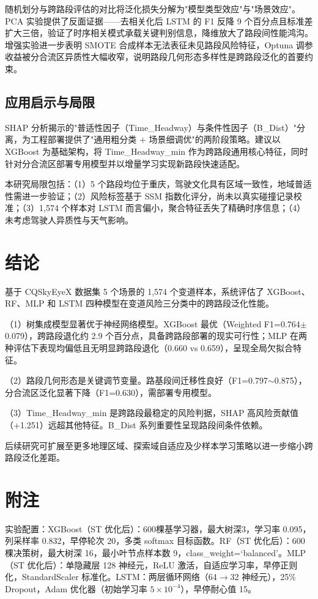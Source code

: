 \documentclass[preprint,review,12pt,a4paper]{elsarticle}
\begin{document}
随机划分与跨路段评估的对比将泛化损失分解为"模型类型效应"与"场景效应"。PCA 实验提供了反面证据——去相关化后 LSTM 的 F1 反降 9 个百分点且标准差扩大三倍，验证了时序相关模式承载关键判别信息，降维放大了路段间性能鸿沟。增强实验进一步表明 SMOTE 合成样本无法表征未见路段风险特征，Optuna 调参收益被分合流区异质性大幅收窄，说明路段几何形态多样性是跨路段泛化的首要约束。

\subsection{应用启示与局限}

SHAP 分析揭示的"普适性因子（Time\_Headway）与条件性因子（B\_Dist）"分离，为工程部署提供了"通用粗分类 + 场景细调优"的两阶段策略。建议以 XGBoost 为基础架构，将 Time\_Headway\_min 作为跨路段通用核心特征，同时针对分合流区部署专用模型并以增量学习实现新路段快速适配。

本研究局限包括：（1）5 个路段均位于重庆，驾驶文化具有区域一致性，地域普适性需进一步验证；（2）风险标签基于 SSM 指数化评分，尚未以真实碰撞记录校准；（3）1,574 个样本对 LSTM 而言偏小，聚合特征丢失了精确时序信息；（4）未考虑驾驶人异质性与天气影响。

\section{结论}

基于 CQSkyEyeX 数据集 5 个场景的 1,574 个变道样本，系统评估了 XGBoost、RF、MLP 和 LSTM 四种模型在变道风险三分类中的跨路段泛化性能。

（1）树集成模型显著优于神经网络模型。XGBoost 最优（Weighted F1=0.764$\pm$0.079），跨路段退化约 2.9 个百分点，具备跨路段部署的现实可行性；MLP 在两种评估下表现均偏低且无明显跨路段退化（0.660 vs 0.659），呈现全局欠拟合特征。

（2）路段几何形态是关键调节变量。路基段间迁移性良好（F1=0.797$\sim$0.875），分合流区泛化显著下降（F1=0.630），需部署专用模型。

（3）Time\_Headway\_min 是跨路段最稳定的风险判据，SHAP 高风险贡献值（+1.251）远超其他特征。B\_Dist 系列重要性呈现路段间条件依赖。

后续研究可扩展至更多地理区域、探索域自适应及少样本学习策略以进一步缩小跨路段泛化差距。

\appendix
\section{附注}
实验配置：XGBoost（ST 优化后）：600棵基学习器，最大树深3，学习率 0.095，列采样率 0.832，早停轮次 20，多类 softmax 目标函数。RF（ST 优化后）：600棵决策树，最大树深 16，最小叶节点样本数 9，class\_weight=`balanced'。MLP（ST 优化后）：单隐藏层 128 神经元，ReLU 激活，自适应学习率，早停正则化，StandardScaler 标准化。LSTM：两层循环网络（64$\to$32 神经元），25\% Dropout，Adam 优化器（初始学习率 $5\times10^{-4}$），早停耐心值 15。
\end{document}
